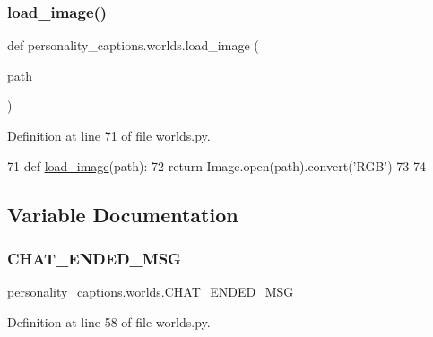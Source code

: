\subsubsection{\texorpdfstring{load\+\_\+image()}{load\_image()}}
{\footnotesize\ttfamily def personality\+\_\+captions.\+worlds.\+load\+\_\+image (\begin{DoxyParamCaption}\item[{}]{path }\end{DoxyParamCaption})}



Definition at line 71 of file worlds.\+py.


\begin{DoxyCode}
71 \textcolor{keyword}{def }\hyperlink{namespacepersonality__captions_1_1worlds_a2863737d97a8e8c5a1ebe9029d0d2293}{load\_image}(path):
72     \textcolor{keywordflow}{return} Image.open(path).convert(\textcolor{stringliteral}{'RGB'})
73 
74 
\end{DoxyCode}


\subsection{Variable Documentation}
\mbox{\label{namespacepersonality__captions_1_1worlds_ab5f20ce3940daeff015b65b3685165ed}} 
\subsubsection{\texorpdfstring{C\+H\+A\+T\+\_\+\+E\+N\+D\+E\+D\+\_\+\+M\+SG}{CHAT\_ENDED\_MSG}}
{\footnotesize\ttfamily personality\+\_\+captions.\+worlds.\+C\+H\+A\+T\+\_\+\+E\+N\+D\+E\+D\+\_\+\+M\+SG}



Definition at line 58 of file worlds.\+py.

\mbox{\label{namespacepersonality__captions_1_1worlds_a99bd89bff3bd5eff96f3dbb924374496}} 

